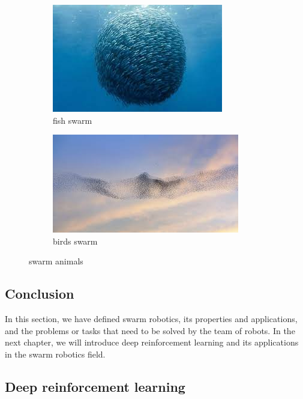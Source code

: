 \documentclass[12pt]{extarticle}
\begin{document}
\begin{figure}
\centering

\begin{subfigure}{.5\textwidth}
  \centering
  \includegraphics[width=.8\linewidth]{swarmfish}
  \caption{fish swarm }
  \label{fig:sub1}
\end{subfigure}%
\begin{subfigure}{.5\textwidth}
  \centering
  \includegraphics[width=.8\linewidth]{swarmbirds }
  \caption{birds swarm  }
  \label{fig:sub2}
\end{subfigure}
\caption{swarm animals}

\label{fig:test}
\end{figure}



\subsection{Conclusion}
In this section, we have defined swarm robotics, its properties and applications, and the problems or tasks that need to be solved by the team of robots. In the next chapter, we will introduce deep reinforcement learning and its applications in the swarm robotics field.


\newpage
\pagebreak
\hspace{0pt}
\vfill
\begin{center}
\section{Deep reinforcement learning}
\end{center}
\vfill
\hspace{0pt}
\end{document}
